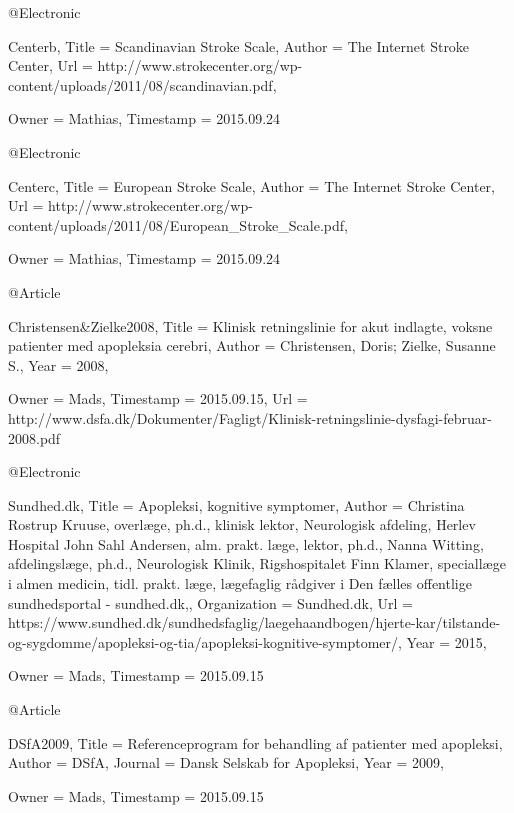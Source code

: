 @Electronic{Centerb,
  Title                    = {Scandinavian Stroke Scale},
  Author                   = {The Internet Stroke Center},
  Url                      = {http://www.strokecenter.org/wp-content/uploads/2011/08/scandinavian.pdf},

  Owner                    = {Mathias},
  Timestamp                = {2015.09.24}
}

@Electronic{Centerc,
  Title                    = {European Stroke Scale},
  Author                   = {The Internet Stroke Center},
  Url                      = {http://www.strokecenter.org/wp-content/uploads/2011/08/European_Stroke_Scale.pdf},

  Owner                    = {Mathias},
  Timestamp                = {2015.09.24}
}

@Article{Christensen&Zielke2008,
  Title                    = {Klinisk retningslinie for akut indlagte, voksne patienter med apopleksia cerebri},
  Author                   = {Christensen, Doris; Zielke, Susanne S.},
  Year                     = {2008},

  Owner                    = {Mads},
  Timestamp                = {2015.09.15},
  Url                      = {http://www.dsfa.dk/Dokumenter/Fagligt/Klinisk-retningslinie-dysfagi-februar-2008.pdf}
}

@Electronic{Sundhed.dk,
  Title                    = {Apopleksi, kognitive symptomer},
  Author                   = {Christina Rostrup Kruuse, overlæge, ph.d., klinisk lektor, Neurologisk afdeling, Herlev Hospital
John Sahl Andersen, alm. prakt. læge, lektor, ph.d.,
Nanna Witting, afdelingslæge, ph.d., Neurologisk Klinik, Rigshospitalet
Finn Klamer, speciallæge i almen medicin, tidl. prakt. læge, lægefaglig rådgiver i Den fælles offentlige sundhedsportal - sundhed.dk,},
  Organization             = {Sundhed.dk},
  Url                      = {https://www.sundhed.dk/sundhedsfaglig/laegehaandbogen/hjerte-kar/tilstande-og-sygdomme/apopleksi-og-tia/apopleksi-kognitive-symptomer/},
  Year                     = {2015},

  Owner                    = {Mads},
  Timestamp                = {2015.09.15}
}

@Article{DSfA2009,
  Title                    = {Referenceprogram for behandling af patienter med apopleksi},
  Author                   = {DSfA},
  Journal                  = {Dansk Selskab for Apopleksi},
  Year                     = {2009},

  Owner                    = {Mads},
  Timestamp                = {2015.09.15}
}

